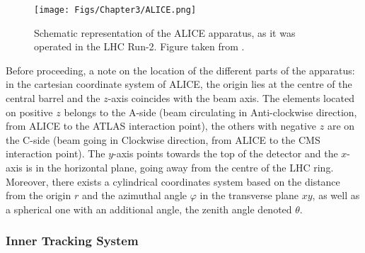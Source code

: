 \begin{figure}[t]
	\centering
	\texttt{[image: Figs/Chapter3/ALICE.png]}
	\caption{Schematic representation of the ALICE apparatus, as it was operated in the LHC Run-2. Figure taken from \cite{alicecollaborationALICEExperimentJourney2022}.}
	\label{fig:ALICEdetector}
\end{figure}

Before proceeding, a note on the location of the different parts of the apparatus: in the cartesian coordinate system of ALICE, the origin lies at the centre of the central barrel and the $z$-axis coincides with the beam axis. The elements located on positive $z$ belongs to the A-side (beam circulating in Anti-clockwise direction, from ALICE to the ATLAS interaction point), the others with negative $z$ are on the C-side (beam going in Clockwise direction, from ALICE to the CMS interaction point). The $y$-axis points towards the top of the detector and the $x$-axis is in the horizontal plane, going away from the centre of the LHC ring. Moreover, there exists a cylindrical coordinates system based on the distance from the origin $r$ and the azimuthal angle $\varphi$ in the transverse plane $xy$, as well as a spherical one with an additional angle, the zenith angle denoted $\theta$.



\subsubsection{Inner Tracking System}
\label{subsubsec:ITS}

